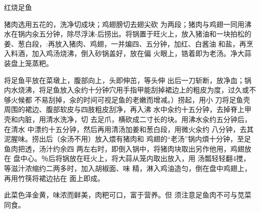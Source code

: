 \begin{recipe}{红烧足鱼}

\ingredients



\cooking

\step 猪肉选用五花的，洗净切成块；鸡翅膀切去翅尖砍
为两段；猪肉与鸡翅一同用沸水在锅内汆五分钟，除尽浮沫-后捞出。将锅置于旺火上，放入猪油和一块拍松的姜、葱白段，:再放入猪肉、鸡翅，一并煸四、五分钟，加红、白酱油 和盐，再烹入料酒，加入鸡汤烧沸，倒入砂锅盖好，放在偏 火眼上，锆着即为老汤。净大蒜装盘上笼蒸粑。

\step 将足鱼平放在菜墩上，腹部向上，头即伸茁，等头伸
出后一刀斩断，放净血；锅内水烧沸，将足鱼放入汆约十分钟穴用手指甲能刮掉裙边上的粗皮为度，过久或不够火候都 不易刮掉，汆的时间可视足鱼的老嫩而增减。）捞起，用小 刀将足鱼壳周围的裙边、腹部软皮与四肢粗皮刮净，再入沸 水中汆约十五分钟，去掉脊上甲壳和内脏，用清水洗净，切 去足爪，横砍成二寸长的块。用沸水汆约五分钟后，在清水 中漂约十五分钟，然后再用清汤加姜和葱白段，用微火汆约 八分钟，去其泥腥味。捞出后（汆汤不用）放入煨有猪肉和 鸡翅的“老汤”锅内煩十分钟，至足鱼肉把透，汤汁约余四 两左右时，即倒入锅中，将猪肉块取出另作他用，鸡翅放在 盘中心。％后将锅放在旺火上，将大蒜从笼内取出放入，用 汤瓢轻轻翻4搅，等滋汁浓缩约二两多时，加入胡椒面、味 精，淋入鸡油造匀，倒在盘中鸡翅上，再用竹筷将裙边拈在 面上即成。

\notes

此菜色泽金黄，味浓而鲜美，肉粑可口，富于营养。但 须注意足鱼肉不可与苋菜同食。

\end{recipe}

